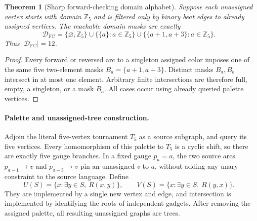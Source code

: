 \documentclass[11pt]{article}
\newtheorem{theorem}{Theorem}
\begin{document}
\begin{theorem}[Sharp forward-checking domain alphabet]
Suppose each unassigned vertex starts with domain \(\mathbb Z_5\)
and is filtered only by binary beat edges to already assigned
vertices. The reachable domain masks are exactly
\[
\mathcal D_{\mathrm{FC}}
=\{\varnothing,\mathbb Z_5\}
\cup\{\{a\}:a\in\mathbb Z_5\}
\cup\{\{a+1,a+3\}:a\in\mathbb Z_5\}.
\]
Thus \(|\mathcal D_{\mathrm{FC}}|=12\).
\end{theorem}
\begin{proof}
Every forward or reversed arc to a singleton assigned color
imposes one of the same five two-element masks
\(B_a=\{a+1,a+3\}\). Distinct masks \(B_a,B_b\)
intersect in at most one element. Arbitrary finite intersections
are therefore full, empty, a singleton, or a mask \(B_a\).
All cases occur using already queried palette vertices.
\end{proof}

\paragraph{Palette and unassigned-tree construction.}
Adjoin the literal five-vertex tournament \(T_5\) as a source
subgraph, and query its five vertices. Every homomorphism
of this palette to \(T_5\) is a cyclic shift, so there are
exactly five gauge branches. In a fixed gauge \(p_a=a\),
the two source arcs
\(p_{a-1}\to v\) and \(p_{a-3}\to v\) pin
an unassigned \(v\) to \(a\), without adding any
unary constraint to the source language. Define
\[
U(S)=\{x:\exists y\in S,\ R(x,y)\},\qquad
V(S)=\{x:\exists y\in S,\ R(y,x)\}.
\]
They are implemented by a single new vertex and edge, and
intersection is implemented by identifying the roots
of independent gadgets. After removing the assigned palette,
all resulting unassigned graphs are trees.
\end{document}
